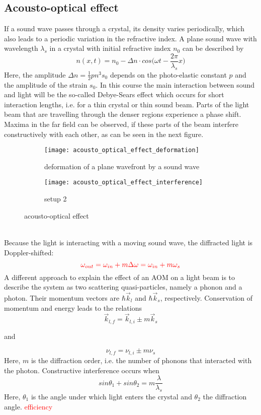\subsection{Acousto-optical effect}
If a sound wave passes through a crystal, its density varies periodically,
which also leads to a periodic variation in the refractive index.
A plane sound wave with wavelength $\lambda_s$ in a crystal with
initial refractive index $n_0$ can be described by
$$n(x,t)=n_0-\Delta n\cdot cos\bigg(\omega t-\frac{2\pi}{\lambda_s}x\bigg)$$
Here, the amplitude $\Delta n=\frac{1}{2}pn^3s_0$ depends on the
photo-elastic constant $p$ and the amplitude of the strain $s_0$.
In this course the main interaction between sound and light will be
the so-called Debye-Sears effect which occurs
for short interaction lengths, i.e. for a thin crystal or thin sound beam.
Parts of the light beam that are travelling through the denser regions
experience a phase shift. Maxima in the far field can be observed, if
these parts of the beam interfere constructively with each other, as can
be seen in the next figure.
\begin{figure}[!h]
\centering
\begin{subfigure}{.5\textwidth}
  \centering
  \texttt{[image: acousto\_optical\_effect\_deformation]}
  \caption{deformation of a plane wavefront by a sound wave}
  \label{acousto_optical_effect_deformation}
\end{subfigure}%
\begin{subfigure}{.5\textwidth}
  \centering
  \texttt{[image: acousto\_optical\_effect\_interference]}
  \caption{setup 2}
  \label{acousto_optical_effect_interference}
\end{subfigure}
\caption{acousto-optical effect}
\label{acousto_optical_effect}
\end{figure} \\
Because the light is interacting with a moving sound wave, the
diffracted light is Doppler-shifted: $$\textcolor{red}{\omega_{out}=
\omega_{in}+m\Delta\omega=\omega_{in}+m\omega_s}$$
\newpage \noindent
A different approach to explain the effect of an AOM on a light beam is to
describe the system as two scattering quasi-particles, namely a phonon
and a photon. Their momentum vectors are $\hbar\vec k_l$ and $\hbar\vec k_s$,
respectively. Conservation of momentum and energy leads to the relations
$$\vec k_{l,f}=\vec k_{l,i}\pm m\vec k_s$$
\begin{center}and\end{center}
$$\nu_{l,f}=\nu_{l,i}\pm m\nu_s$$
Here, $m$ is the diffraction order, i.e. the number of phonons that
interacted with the photon. Constructive interference occurs when
$$sin\theta_1+sin\theta_2=m\frac{\lambda}{\lambda_s}$$
Here, $\theta_1$ is the angle under which light enters the crystal
and $\theta_2$ the diffraction angle.
\textcolor{red}{efficiency}
